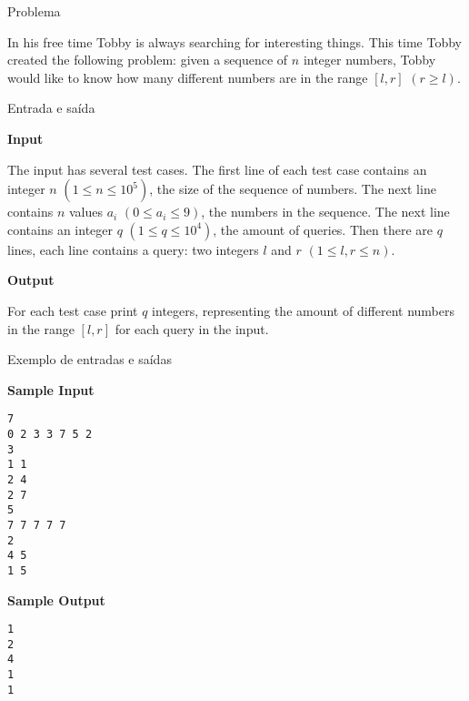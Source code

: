 
\begin{frame}[fragile]{Problema}

In his free time Tobby is always searching for interesting things. This time Tobby created the
following problem: given a sequence of $n$ integer numbers, Tobby would like to know how many
different numbers are in the range $[l, r]$ $(r\geq l)$.

\end{frame}

\begin{frame}[fragile]{Entrada e saída}

\textbf{Input}

The input has several test cases. The first line of each test case contains an integer $n$
$(1\leq n\leq 10^5)$, the size of the sequence of numbers. The next line contains $n$ values $a_i$
$(0\leq a_i\leq 9)$, the numbers in the sequence. The next line contains an integer $q$
$(1\leq q\leq 10^4)$, the amount of queries. Then there are $q$ lines, each line contains a query:
two integers $l$ and $r$ $(1\leq l, r\leq n)$.

\vspace{0.2in}

\textbf{Output}

For each test case print $q$ integers, representing the amount of different numbers in the range
$[l, r]$ for each query in the input.

\end{frame}

\begin{frame}[fragile]{Exemplo de entradas e saídas}

\begin{minipage}[t]{0.45\textwidth}
\textbf{Sample Input}
\begin{verbatim}
7
0 2 3 3 7 5 2
3
1 1
2 4
2 7
5
7 7 7 7 7
2
4 5
1 5
\end{verbatim}
\end{minipage}
\begin{minipage}[t]{0.5\textwidth}
\textbf{Sample Output}
\begin{verbatim}
1
2
4
1
1
\end{verbatim}
\end{minipage}
\end{frame}

